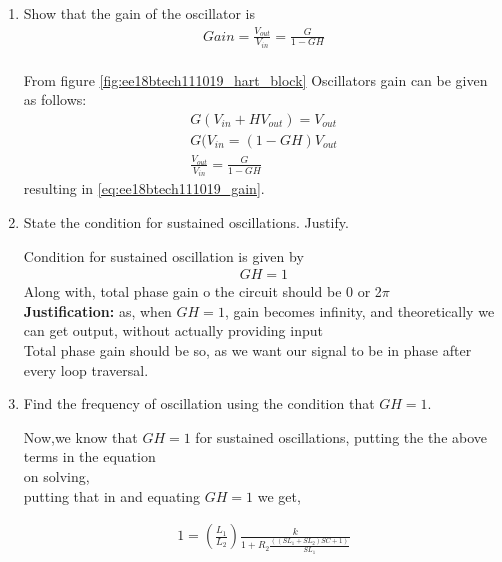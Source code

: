 \begin{enumerate}[label=\thesubsection.\arabic*.,ref=\thesubsection.\theenumi]
\item Show that the gain of the oscillator is \\
\begin{align}
    Gain  = \frac{V_{out}}{V_{in}} = \frac{G}{1 - GH}
\label{eq:ee18btech111019_gain}
\end{align}
%
\\
\solution From figure \ref{fig:ee18btech111019_hart_block}
Oscillators gain can be given as follows:\\
\begin{align}
    G(V_{in} + HV_{out}) =V_{out}\\
    G(V_{in} = (1-GH)V_{out}\\
    \frac{V_{out}}{V_{in}} = \frac{G}{1 - GH}
\end{align}
%
resulting in \eqref{eq:ee18btech111019_gain}.\\



\item State the condition for sustained oscillations. Justify.

\solution Condition for sustained oscillation is given by\\
\begin{align}
    GH = 1
\end{align}
Along with, total phase gain o the circuit should be 0 or 2$\pi$\\
\textbf{Justification:} as, when $ GH =1 $, gain becomes infinity, and theoretically we can get output, without actually providing input\\
Total phase gain should be so, as we want our signal to be in phase after every loop traversal.\\



\item Find the frequency of oscillation using the condition that $GH = 1$.

\solution 
Now,we know that $GH = 1$ for sustained oscillations, putting the the above terms in the equation\\
on solving,\\
    
putting that in and equating $GH=1$ we get,

\begin{align}
    1 = (\frac{L_1}{L_2})\frac{k}{1 + R_2\frac{((SL_1 + SL_2)SC + 1)}{SL_1}}
\end{align}


\end{enumerate}

